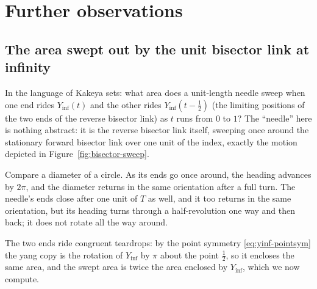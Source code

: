 \documentclass[11pt]{article}
\theoremstyle{definition}
\begin{document}
\clearpage

\section{Further observations}\label{sec:consequences}

\subsection{The area swept out by the unit bisector link at infinity}\label{sec:yinyang-area}

In the language of Kakeya sets: what area does a unit-length needle sweep when
one end rides $Y_{\inf}(t)$ and the other rides $Y_{\inf}(t-\tfrac12)$ (the
limiting positions of the two ends of the reverse bisector link) as $t$
runs from $0$ to $1$? The ``needle'' here is nothing abstract: it is the
reverse bisector link itself, sweeping once around the stationary forward
bisector link over one unit of the index, exactly the motion depicted in
Figure~\ref{fig:bisector-sweep}.

Compare a diameter of a circle. As its ends go once around, the heading
advances by $2\pi$, and the diameter returns in the same orientation after
a full turn. The needle's ends close after one unit of $T$ as well, and it
too returns in the same orientation, but its heading turns through a
half-revolution one way and then back; it does not rotate all the way
around.

The two ends ride congruent teardrops: by
the point symmetry \eqref{eq:yinf-pointsym} the yang copy is the rotation
of $Y_{\inf}$ by $\pi$ about the point $\tfrac12$, so it encloses the same
area, and the swept area is twice the area enclosed by $Y_{\inf}$, which we
now compute.
\end{document}
